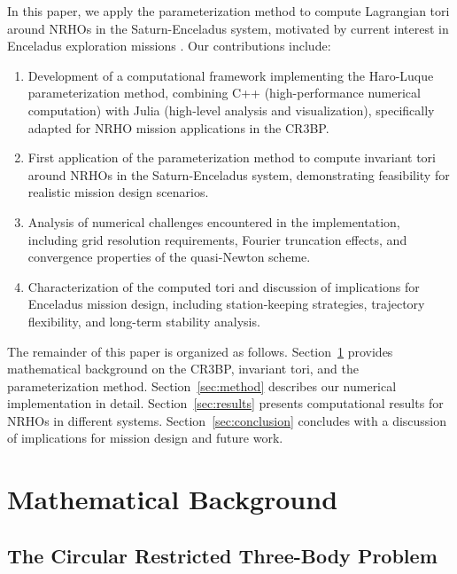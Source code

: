\documentclass[review,onefignum,onetabnum]{siamart220329}
\begin{document}
In this paper, we apply the parameterization method to compute Lagrangian tori
around NRHOs in the Saturn-Enceladus system, motivated by current interest in
Enceladus exploration missions \cite{cable2021enceladus}. Our contributions include:

\begin{enumerate}
    \item Development of a computational framework implementing the Haro-Luque
          parameterization method, combining C++ (high-performance numerical
          computation) with Julia (high-level analysis and visualization),
          specifically adapted for NRHO mission applications in the CR3BP.

    \item First application of the parameterization method to compute invariant
          tori around NRHOs in the Saturn-Enceladus system, demonstrating
          feasibility for realistic mission design scenarios.

    \item Analysis of numerical challenges encountered in the implementation,
          including grid resolution requirements, Fourier truncation effects,
          and convergence properties of the quasi-Newton scheme.

    \item Characterization of the computed tori and discussion of implications
          for Enceladus mission design, including station-keeping strategies,
          trajectory flexibility, and long-term stability analysis.
\end{enumerate}

The remainder of this paper is organized as follows. Section~\ref{sec:background}
provides mathematical background on the CR3BP, invariant tori, and the parameterization
method. Section~\ref{sec:method} describes our numerical implementation in detail.
Section~\ref{sec:results} presents computational results for NRHOs in different
systems. Section~\ref{sec:conclusion} concludes with a discussion of implications
for mission design and future work.

\section{Mathematical Background}
\label{sec:background}

\subsection{The Circular Restricted Three-Body Problem}
\end{document}
